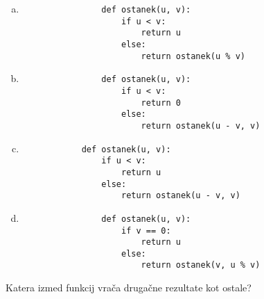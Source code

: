 \documentclass[arhiv, 10pt]{../izpit}
\begin{document}
        \begin{multicols}{2}
        \begin{enumerate}[(a)]
\item 
                \begin{verbatim}
                def ostanek(u, v):
                    if u < v:
                        return u
                    else:
                        return ostanek(u % v)
                \end{verbatim}
            
\item 
                \begin{verbatim}
                def ostanek(u, v):
                    if u < v:
                        return 0
                    else:
                        return ostanek(u - v, v)
                \end{verbatim}
            
\item 
            \begin{verbatim}
            def ostanek(u, v):
                if u < v:
                    return u
                else:
                    return ostanek(u - v, v)
            \end{verbatim}
        
\item 
                \begin{verbatim}
                def ostanek(u, v):
                    if v == 0:
                        return u
                    else:
                        return ostanek(v, u % v)
                \end{verbatim}
            
\end{enumerate}

        \end{multicols}
    
        \naloga*
        
        Katera izmed funkcij vrača drugačne rezultate kot ostale?
    
\end{document}
